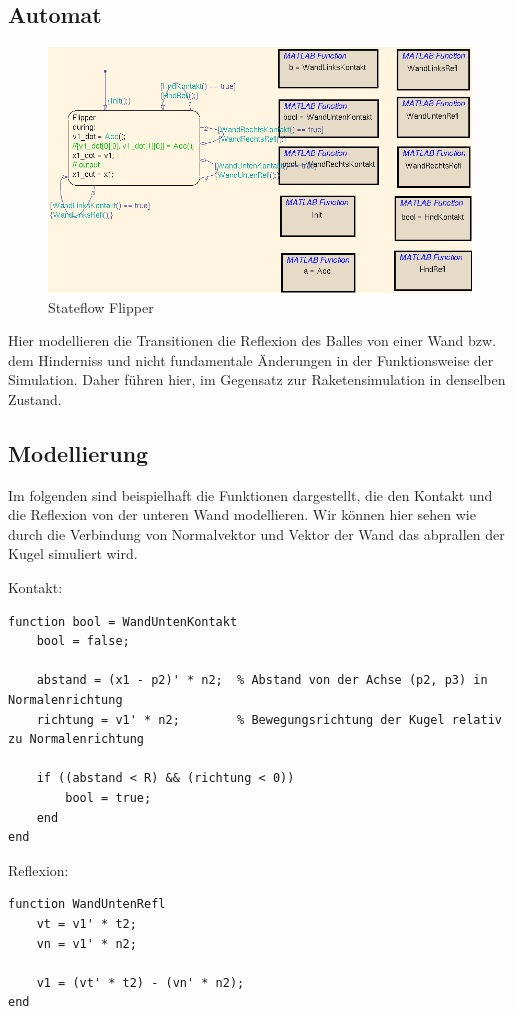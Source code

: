 \documentclass[10pt]{scrartcl}
\begin{document}
	\subsection{Automat}	
	\begin{figure}[htbp]
		\centering
		\includegraphics[scale=0.55]{ScreenshotFlipperAutomat.png}
		\caption{Stateflow Flipper}
		\label{pic:stateflowFlipper}
	\end{figure}
	Hier modellieren die Transitionen die Reflexion des Balles von einer Wand bzw. dem Hinderniss und nicht fundamentale Änderungen in der Funktionsweise der Simulation. Daher führen hier, im Gegensatz zur Raketensimulation in denselben Zustand.		
		
		
		
	\subsection{Modellierung}
	Im folgenden sind beispielhaft die Funktionen dargestellt, die den Kontakt und die Reflexion von der unteren Wand modellieren. Wir können hier sehen wie durch die Verbindung von Normalvektor und Vektor der Wand das abprallen der Kugel simuliert wird.
	
	Kontakt:
	\begin{lstlisting}[tabsize=2, frame=single, label=Stiff, caption={WandUntenKontakt}]
	function bool = WandUntenKontakt
    bool = false;
    
    abstand = (x1 - p2)' * n2;  % Abstand von der Achse (p2, p3) in Normalenrichtung
    richtung = v1' * n2;        % Bewegungsrichtung der Kugel relativ zu Normalenrichtung
    
    if ((abstand < R) && (richtung < 0))
        bool = true;
    end
end
	\end{lstlisting}		

Reflexion:
\begin{lstlisting}[tabsize=2, frame=single, label=Stiff, caption={WandUntenReflexion}]
	function WandUntenRefl
    vt = v1' * t2;
    vn = v1' * n2;
    
    v1 = (vt' * t2) - (vn' * n2);
end
	\end{lstlisting}
\end{document}
